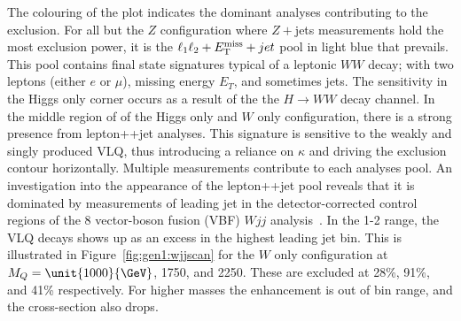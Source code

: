 The colouring of the plot indicates the dominant analyses contributing to the exclusion. For all but the $Z$ configuration where $Z+$jets measurements hold the most exclusion power, it is the \ATLAS $\ell_1 \ell_2 + E_\mathrm{T}^\mathrm{miss}{} + jet$ pool in light blue that prevails. This pool contains final state signatures typical of a leptonic $WW$ decay; with two leptons (either $e$ or $\mu$), missing energy $E_T$, and sometimes jets. The sensitivity in the Higgs only corner occurs as a result of the the $H\rightarrow WW$ decay channel. In the middle region of of the Higgs only and $W$ only configuration, there is a strong presence from \ATLAS lepton+\MET{}+jet analyses. This signature is sensitive to the weakly and singly produced VLQ, thus introducing a reliance on $\kappa$ and driving the exclusion contour horizontally. Multiple measurements contribute to each analyses pool. An investigation into the appearance of the lepton+\MET{}+jet pool reveals that it is dominated by measurements of leading jet \pT in the detector-corrected control regions of the \unit{8}{\TeV} \ATLAS vector-boson fusion (VBF) $Wjj$ analysis~\cite{Aaboud:2017fye}. In the \unit{1}{\TeV}-\unit{2}{\TeV} range, the VLQ decays shows up as an excess in the highest leading jet \pT bin. This is illustrated in Figure~\ref{fig:gen1:wjjscan} for the $W$ only configuration at $M_Q=\unit{1000}{\GeV}$, \unit{1750}{\GeV}, and \unit{2250}{\GeV}. These are excluded at 28\%, 91\%, and 41\% respectively. For higher masses the enhancement is out of bin range, and the cross-section also drops. 

